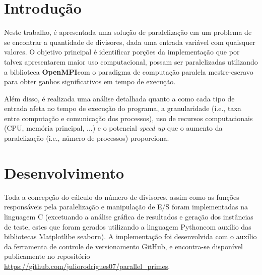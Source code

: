\documentclass[a4paper, 12pt]{article}
\begin{document}
\tableofcontents
\newpage
\section{Introdução}

Neste trabalho, é apresentada uma solução de paralelização em um problema de se encontrar a quantidade de divisores, dada uma entrada variável com quaisquer valores. O objetivo principal é identificar porções da implementação que por talvez apresentarem maior uso computacional, possam ser paralelizadas utilizando a biblioteca \textbf{OpenMPI}\footnotemark \hspace{0.1cm}com o paradigma de computação paralela mestre-escravo para obter ganhos significativos em tempo de execução.


Além disso, é realizada uma análise detalhada quanto a como cada tipo de entrada afeta no tempo de execução do programa, a granularidade (i.e., taxa entre computação e comunicação dos processos), uso de recursos computacionais (CPU, memória principal, ...) e o potencial \emph{speed up} que o aumento da paralelização (i.e., número de processos) proporciona.

\section{Desenvolvimento}

Toda a concepção do cálculo do número de divisores, assim como as funções responsáveis pela paralelização e manipulação de E/S foram implementadas na linguagem C (excetuando a análise gráfica de resultados e geração dos instâncias de teste, estes que foram gerados utilizando a linguagem Python\footnotemark \hspace{0.1cm}com auxílio das bibliotecas Matplotlib\footnotemark \hspace{0.1cm}e seaborn\footnotemark). A implementação foi desenvolvida com o auxílio da ferramenta de controle de versionamento GitHub\footnotemark, e encontra-se disponível publicamente no repositório \url{https://github.com/juliorodrigues07/parallel_primes}.

\end{document}
